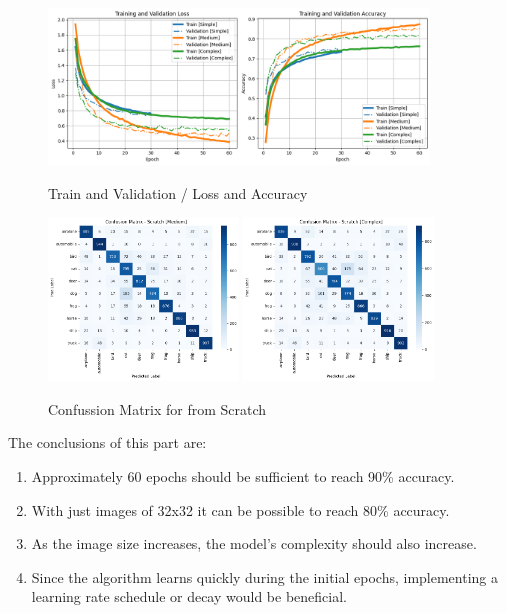 \documentclass{cpsc202}
\begin{document}
    \begin{figure}[h]
        \caption{Train and Validation / Loss and Accuracy}
        \centering
        \includegraphics[width=0.9\textwidth]{training_metrics_scratch_01}
        \label{fig:training_metrics_scratch_01}
    \end{figure}
    \begin{figure}[h]
        \caption{Confussion Matrix for from Scratch}
        \centering
        \includegraphics[width=0.45\textwidth]{confusion_matrix_scratch05_complex}
        \includegraphics[width=0.45\textwidth]{confusion_matrix_scratch06}
        \label{fig:confussion_matrix_scratach}
    \end{figure}

    The conclusions of this part are:
    \begin{enumerate}
        \item Approximately 60 epochs should be sufficient to reach 90\% accuracy.
        \item With just images of 32x32 it can be possible to reach 80\% accuracy.
        \item As the image size increases, the model's complexity should also increase.
        \item Since the algorithm learns quickly during the initial epochs, implementing a learning rate schedule or decay would be beneficial.
    \end{enumerate}
\end{document}
